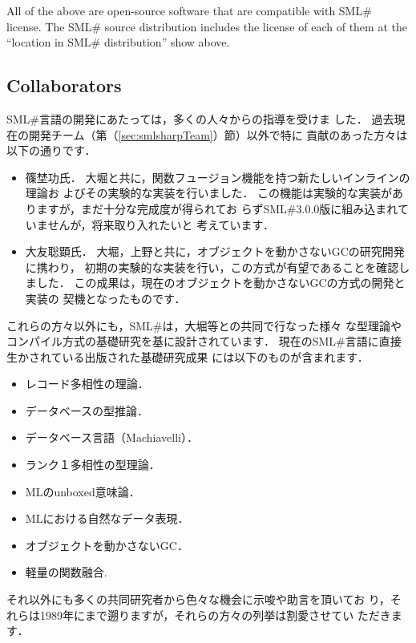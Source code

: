 \documentclass{jbook}
\newif\ifjp
\newcommand{\txt}[2]{#2}
\newcommand{\smlsharp}{SML\#}
\newcommand{\version}{3.0.0}
\begin{document}
	All of the above are open-source software that are compatible
with \smlsharp{} license.
	The \smlsharp{} source distribution includes the license of each
of them at the ``location in \smlsharp{} distribution'' show above.
\fi%

\subsection{\txt{研究開発協力者}{Collaborators}}

\ifjp%
	\smlsharp{}言語の開発にあたっては，多くの人々からの指導を受けま
した．
	過去現在の開発チーム（第（\ref{sec:smlsharpTeam}）節）以外で特に
貢献のあった方々は以下の通りです．
\begin{itemize}
\item 篠埜功氏．
	大堀と共に，関数フュージョン機能を持つ新たしいインラインの理論お
よびその実験的な実装を行いました．
	この機能は実験的な実装がありますが，まだ十分な完成度が得られてお
らず\smlsharp{}\version{}版に組み込まれていませんが，将来取り入れたいと
考えています．
\item 大友聡顕氏．
	大堀，上野と共に，オブジェクトを動かさないGCの研究開発に携わり，
初期の実験的な実装を行い，この方式が有望であることを確認しました．
	この成果は，現在のオブジェクトを動かさないGCの方式の開発と実装の
契機となったものです．
\end{itemize}
	これらの方々以外にも，\smlsharp{}は，大堀等との共同で行なった様々
な型理論やコンパイル方式の基礎研究を基に設計されています．
	現在の\smlsharp{}言語に直接生かされている出版された基礎研究成果
には以下のものが含まれます．
\begin{itemize}
\item レコード多相性の理論\cite{ohor92popl,ohor95toplas}．
\item データベースの型推論\cite{ohor88lfp}．
\item データベース言語（Machiavelli）\cite{ohor89sigmod,bune96tods}．
\item ランク１多相性の型理論\cite{ohor99icfp}．
\item MLのunboxed意味論\cite{ohor97unbox}．
\item MLにおける自然なデータ表現\cite{nguyen06ppdp}．
\item オブジェクトを動かさないGC\cite{ueno11icfp}．
\item 軽量の関数融合\cite{ohor07popl}.
\end{itemize}
	それ以外にも多くの共同研究者から色々な機会に示唆や助言を頂いてお
り，それらは1989年にまで遡りますが，それらの方々の列挙は割愛させてい
ただきます．
\else%
\end{document}
